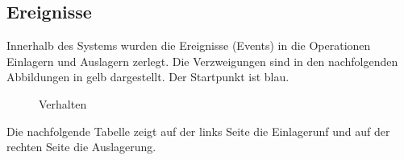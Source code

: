 \subsection{Ereignisse}
Innerhalb des Systems wurden die Ereignisse (Events) in die Operationen Einlagern und Auslagern zerlegt. Die Verzweigungen sind in den nachfolgenden Abbildungen in gelb dargestellt. Der Startpunkt ist blau. 
%
\begin{figure}[H]
\hfill
{}
\caption{Verhalten}
\end{figure}
%
Die nachfolgende Tabelle zeigt auf der links Seite die Einlagerunf und auf der rechten Seite die Auslagerung.
%
